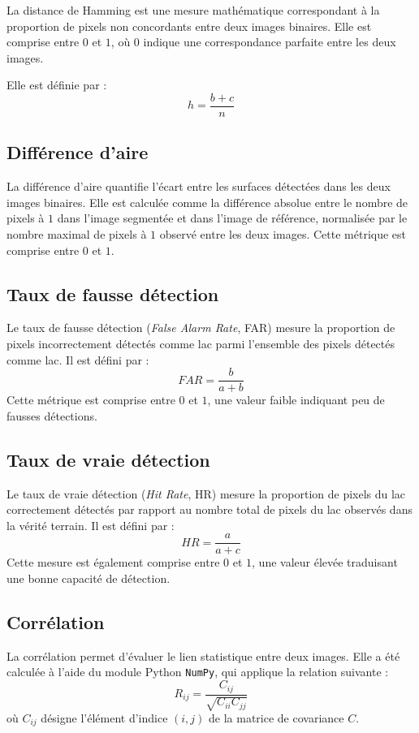 \documentclass[11pt,a4paper]{article}
\begin{document}
La distance de Hamming est une mesure mathématique correspondant à la proportion de pixels non concordants entre deux images binaires. Elle est comprise entre $0$ et $1$, où $0$ indique une correspondance parfaite entre les deux images.

Elle est définie par :
\[
h = \frac{b + c}{n}
\]

\subsection{Différence d’aire}

La différence d’aire quantifie l’écart entre les surfaces détectées dans les deux images binaires. Elle est calculée comme la différence absolue entre le nombre de pixels à $1$ dans l’image segmentée et dans l’image de référence, normalisée par le nombre maximal de pixels à $1$ observé entre les deux images. Cette métrique est comprise entre $0$ et $1$.

\subsection{Taux de fausse détection}

Le taux de fausse détection (\textit{False Alarm Rate}, FAR) mesure la proportion de pixels incorrectement détectés comme lac parmi l’ensemble des pixels détectés comme lac. Il est défini par :
\[
FAR = \frac{b}{a + b}
\]
Cette métrique est comprise entre $0$ et $1$, une valeur faible indiquant peu de fausses détections.

\subsection{Taux de vraie détection}

Le taux de vraie détection (\textit{Hit Rate}, HR) mesure la proportion de pixels du lac correctement détectés par rapport au nombre total de pixels du lac observés dans la vérité terrain. Il est défini par :
\[
HR = \frac{a}{a + c}
\]
Cette mesure est également comprise entre $0$ et $1$, une valeur élevée traduisant une bonne capacité de détection.

\subsection{Corrélation}

La corrélation permet d’évaluer le lien statistique entre deux images. Elle a été calculée à l’aide du module Python \texttt{NumPy}, qui applique la relation suivante :
\[
R_{ij} = \frac{C_{ij}}{\sqrt{C_{ii} C_{jj}}}
\]
où $C_{ij}$ désigne l’élément d’indice $(i,j)$ de la matrice de covariance $C$.
\end{document}
